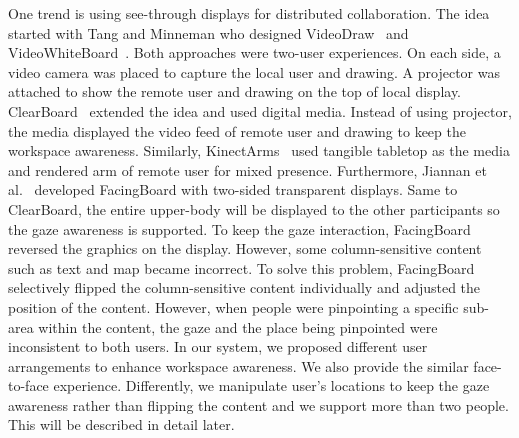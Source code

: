 \documentclass{sigchi}
\begin{document}
One trend is using see-through displays for distributed collaboration. The idea started with Tang and Minneman who designed VideoDraw~\cite{tang1990videodraw} and VideoWhiteBoard~\cite{tang1991videowhiteboard}. Both approaches were two-user experiences. On each side, a video camera was placed to capture the local user and drawing. A projector was attached to show the remote user and drawing on the top of local display. ClearBoard~\cite{ishii1992clearboard} extended the idea and used digital media. Instead of using projector, the media displayed the video feed of remote user and drawing to keep the workspace awareness. Similarly, KinectArms~\cite{genest2013kinectarms} used tangible tabletop as the media and rendered arm of remote user for mixed presence. Furthermore, Jiannan et al.~\cite{li2014interactive} developed FacingBoard with two-sided transparent displays. Same to ClearBoard, the entire upper-body will be displayed to the other participants so the gaze awareness is supported. To keep the gaze interaction, FacingBoard reversed the graphics on the display. However, some column-sensitive content such as text and map became incorrect. To solve this problem, FacingBoard selectively flipped the column-sensitive content individually and adjusted the position of the content. However, when people were pinpointing a specific sub-area within the content, the gaze and the place being pinpointed were inconsistent to both users. In our system, we proposed different user arrangements to enhance workspace awareness. We also provide the similar face-to-face experience. Differently, we manipulate user's locations to keep the gaze awareness rather than flipping the content and we support more than two people. This will be described in detail later.
\end{document}
